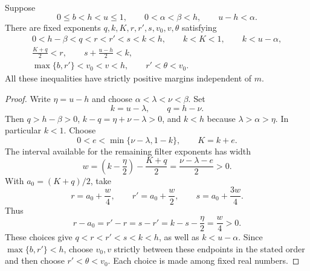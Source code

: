 \begin{samepage}
\begin{lemma}
\label{lem:exponent-budget}
Suppose
\[
 0\le b<h<u\le1,
 \qquad 0<\alpha<\beta<h,
 \qquad u-h<\alpha.
\]
There are fixed exponents $q,k,K,r,r',s,v_0,v,\theta$ satisfying
\begin{gather*}
 0<h-\beta<q<r<r'<s<k<h,
 \qquad k<K<1,
 \qquad k<u-\alpha,\\
 \frac{K+q}{2}<r,
 \qquad s+\frac{u-h}{2}<k,\\
 \max\{b,r'\}<v_0<v<h,
 \qquad r'<\theta<v_0.
\end{gather*}
All these inequalities have strictly positive margins independent of
$m$.
\end{lemma}
\end{samepage}

\begin{proof}
Write $\eta=u-h$ and choose
$\alpha<\lambda<\nu<\beta$.  Set
\[
 k=u-\lambda,
 \qquad q=h-\nu.
\]
Then $q>h-\beta>0$, $k-q=\eta+\nu-\lambda>0$, and
$k<h$ because $\lambda>\alpha>\eta$.  In particular $k<1$.
Choose
\[
 0<e<\min\{\nu-\lambda,1-k\},
 \qquad K=k+e.
\]
The interval available for the remaining filter exponents has width
\[
 w=\left(k-\frac{\eta}{2}\right)-\frac{K+q}{2}
   =\frac{\nu-\lambda-e}{2}>0.
\]
With $a_0=(K+q)/2$, take
\[
 r=a_0+\frac w4,
 \qquad r'=a_0+\frac w2,
 \qquad s=a_0+\frac{3w}{4}.
\]
Thus
\[
 r-a_0=r'-r=s-r'=k-s-\frac\eta2=\frac w4>0.
\]
These choices give $q<r<r'<s<k<h$, as well as
$k<u-\alpha$.  Since $\max\{b,r'\}<h$, choose $v_0,v$
strictly between these endpoints in the stated order and then choose
$r'<\theta<v_0$.  Each choice is made among fixed real numbers.
\end{proof}


